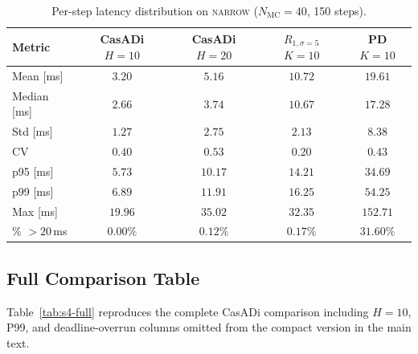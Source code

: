 \documentclass[11pt,a4paper]{article}
\newcommand{\Nm}{N_{\mathrm{MC}}}
\begin{document}
\begin{table}[h]
\centering
\caption{Per-step latency distribution on \textsc{narrow}
($\Nm = 40$, 150 steps).}\label{tab:s4-latency}
\begin{tabular}{lcccc}
\toprule
Metric & CasADi $H{=}10$ & CasADi $H{=}20$ & $R_{1,\sigma=5}$ $K{=}10$ & PD $K{=}10$ \\
\midrule
Mean [ms] & $3.20$ & $5.16$ & $10.72$ & $19.61$ \\
Median [ms] & $2.66$ & $3.74$ & $10.67$ & $17.28$ \\
Std [ms] & $1.27$ & $2.75$ & $2.13$ & $8.38$ \\
CV & $0.40$ & $0.53$ & $0.20$ & $0.43$ \\
p95 [ms] & $5.73$ & $10.17$ & $14.21$ & $34.69$ \\
p99 [ms] & $6.89$ & $11.91$ & $16.25$ & $54.25$ \\
Max [ms] & $19.96$ & $35.02$ & $32.35$ & $152.71$ \\
\% $>20$\,ms & $0.00\%$ & $0.12\%$ & $0.17\%$ & $31.60\%$ \\
\bottomrule
\end{tabular}
\end{table}

\subsection{Full Comparison Table}

Table~\ref{tab:s4-full} reproduces the complete CasADi comparison
including $H{=}10$, P99, and deadline-overrun columns omitted from
the compact version in the main text.
\end{document}
